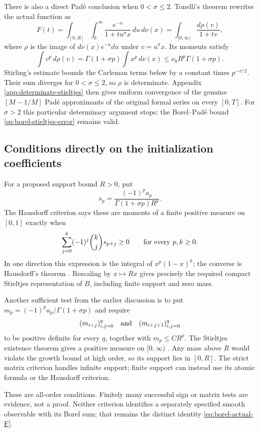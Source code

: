 There is also a direct Pad\'e conclusion when $0<\sigma\le2$.
Tonelli's theorem rewrites the actual function as
\[
 F(t)=\int_{[0,R]}\int_0^\infty
 \frac{e^{-u}}{1+tu^\sigma x}\,du\,d\nu(x)
 =\int_{[0,\infty)}\frac{d\rho(v)}{1+tv},
\]
where $\rho$ is the image of $d\nu(x)e^{-u}du$ under $v=u^\sigma x$.
Its moments satisfy
\[
 \int v^p\,d\rho(v)
 =\Gamma(1+\sigma p)\int x^p\,d\nu(x)
 \le\nu_0R^p\Gamma(1+\sigma p).
\]
Stirling's estimate bounds the Carleman terms below by a constant times
$p^{-\sigma/2}$. Their sum diverges for $0<\sigma\le2$, so $\rho$
is determinate. Appendix \ref{app:determinate-stieltjes} then gives
uniform convergence of the genuine $[M-1/M]$ Pad\'e approximants
of the original formal series on every $[0,T]$.
For $\sigma>2$ this particular determinacy argument stops; the
Borel--Pad\'e bound \eqref{eq:borel-stieltjes-error} remains valid.

\subsection{Conditions directly on the initialization coefficients}
\label{app:coefficient-tests}

For a proposed support bound $R>0$, put
\[
 s_p=\frac{(-1)^pa_p}{\Gamma(1+\sigma p)R^p}.
\]
The Hausdorff criterion says these are moments of a finite positive
measure on $[0,1]$ exactly when
\[
 \sum_{j=0}^{k}(-1)^j\binom{k}{j}s_{p+j}\ge0
 \qquad\hbox{for every }p,k\ge0.
\]
In one direction this expression is the integral of $x^p(1-x)^k$;
the converse is Hausdorff's theorem \cite{LiuPego}.
Rescaling by $x\mapsto Rx$ gives precisely the required compact
Stieltjes representation of $B$, including finite support and zero mass.

Another sufficient test from the earlier discussion is to put
$m_p=(-1)^pa_p/\Gamma(1+\sigma p)$ and require
\[
 (m_{i+j})_{i,j=0}^{q}
 \quad\hbox{and}\quad
 (m_{i+j+1})_{i,j=0}^{q}
\]
to be positive definite for every $q$, together with $m_p\le C R^p$.
The Stieltjes existence theorem gives a positive measure on
$[0,\infty)$ \cite{SimonMoments}. Any mass above $R$ would violate
the growth bound at high order, so its support lies in $[0,R]$.
The strict matrix criterion handles infinite support; finite support
can instead use its atomic formula or the Hausdorff criterion.

These are all-order conditions. Finitely many successful sign or
matrix tests are evidence, not a proof. Neither criterion identifies a
separately specified smooth observable with its Borel sum; that remains
the distinct identity \eqref{eq:borel-actual-F}.

